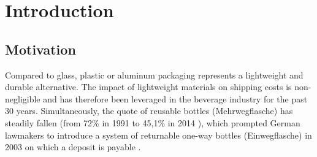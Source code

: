 

\chapter{Introduction}

\section{Motivation}
\label{sec:motivation}
Compared to glass, plastic or aluminum packaging represents a lightweight and durable alternative. The impact of lightweight materials on shipping costs is non-negligible and has therefore been leveraged in the beverage industry for the past 30 years. Simultaneously, the quote of reusable bottles (Mehrwegflasche) has steadily fallen (from 72\% in 1991 \cite[§ 9 Abs. 2]{verpackV} to 45,1\% in 2014 \cite{umweltBundesamt}), which prompted German lawmakers to introduce a system of returnable one-way bottles (Einwegflasche) in 2003 on which a deposit is payable \cite[§ 9 Abs. 2]{verpackV}. 

